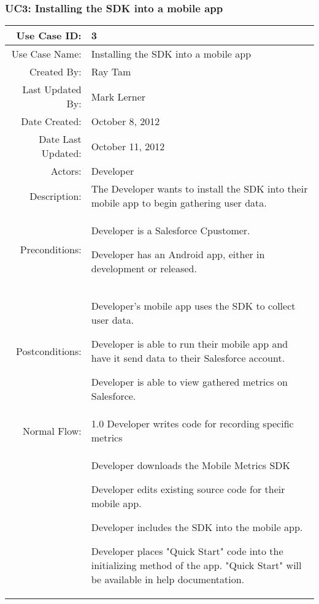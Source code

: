 \documentclass[12pt,oneside,letterpaper]{article}
\newenvironment{packed_enumerate}{ %
\vspace{-7mm}
\begin{enumerate}
  \setlength{\itemsep}{0pt}
  \setlength{\parskip}{0pt}
  \setlength{\parsep}{0pt}
}{\end{enumerate}
\vspace{-8mm}}
\begin{document}
\subsubsection{\label{Installing SDK into App}UC3: Installing the SDK into a mobile app}
\begin{longtable}{|r|p{3.8in}|}
\hline
Use Case ID:&3\\
\hline
Use Case Name:&Installing the SDK into a mobile app\\
\hline
Created By:&Ray Tam\\
\hline
Last Updated By:&Mark Lerner\\
\hline
Date Created:&October 8, 2012\\
\hline
Date Last Updated:&October 11, 2012\\
\hline
Actors:&Developer\\
\hline
Description:& The Developer wants to install the SDK into their mobile app to begin gathering user data.\\
\hline
Preconditions:&
\begin{packed_enumerate}
\item Developer is a Salesforce Cpustomer.
\item Developer has an Android app, either in development or released.
\end{packed_enumerate}\\
\hline
Postconditions:&
\begin{packed_enumerate}
\item Developer's mobile app uses the SDK to collect user data.
\item Developer is able to run their mobile app and have it send data to their Salesforce account.
\item Developer is able to view gathered metrics on Salesforce.
\end{packed_enumerate}\\
\hline
Normal Flow:&1.0 Developer writes code for recording specific metrics\\
&  %
\begin{packed_enumerate}
\item Developer downloads the Mobile Metrics SDK
\item Developer edits existing source code for their mobile app.
\item Developer includes the SDK into the mobile app.
\item Developer places "Quick Start" code into the initializing method of the app. "Quick Start" will be available in help documentation.

\end{packed_enumerate}
\end{longtable}
\end{document}
